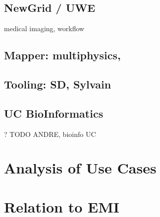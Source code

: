 \documentclass[3p,twocolumn]{article}
\begin{document}
 \subsection{NewGrid / UWE}

  medical imaging, workflow


 \subsection{Mapper: multiphysics,}


 \subsection{Tooling: SD, Sylvain}


 \subsection{UC BioInformatics}

  ? TODO ANDRE, bioinfo UC


\section{Analysis of Use Cases}


\section{Relation to EMI}




\end{document}
